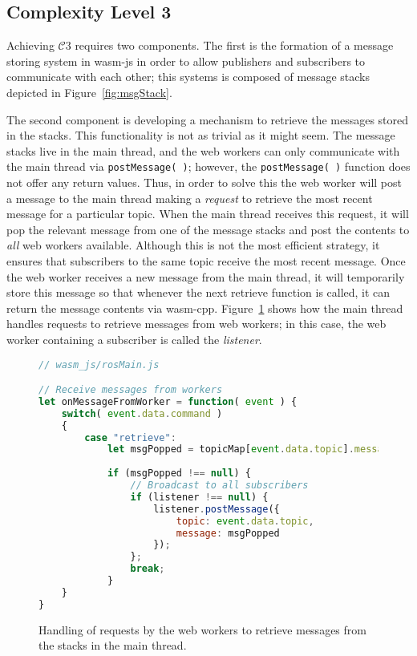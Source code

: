         \subsection{Complexity Level 3}

        Achieving $\mathcal{C}3$ requires two components. The first is the formation of a message storing system in \textsf{wasm-js} in order to allow publishers and subscribers to communicate with each other; this systems is composed of message stacks depicted in Figure~\ref{fig:msgStack}. 
        
        The second component is developing a mechanism to retrieve the messages stored in the stacks. This functionality is not as trivial as it might seem. The message stacks live in the main thread, and the web workers can only communicate with the main thread via \texttt{postMessage( )}; however, the \texttt{postMessage( )} function does not offer any return values. Thus, in order to solve this the web worker will post a message to the main thread making a \textit{request} to retrieve the most recent message for a particular topic. When the main thread receives this request, it will pop the relevant message from one of the message stacks and post the contents to \textit{all} web workers available. Although this is not the most efficient strategy, it ensures that subscribers to the same topic receive the most recent message. Once the web worker receives a new message from the main thread, it will temporarily store this message so that whenever the next retrieve function is called, it can return the message contents via \textsf{wasm-cpp}. Figure~\ref{fig:retrieval} shows how the main thread handles requests to retrieve messages from web workers; in this case, the web worker containing a subscriber is called the \textit{listener}.

        \begin{figure}[htbp]
            \begin{lstlisting}[language=javascript]
// wasm_js/rosMain.js

// Receive messages from workers
let onMessageFromWorker = function( event ) {
    switch( event.data.command )
    {
        case "retrieve":
            let msgPopped = topicMap[event.data.topic].messages.pop();
            
            if (msgPopped !== null) {
                // Broadcast to all subscribers
                if (listener !== null) { 
                    listener.postMessage({
                        topic: event.data.topic,
                        message: msgPopped
                    }); 
                };         
                break;
            }
    }
}
\end{lstlisting}
            \caption{Handling of requests by the web workers to retrieve messages from the stacks in the main thread.}
            \label{fig:retrieval}
        \end{figure}


